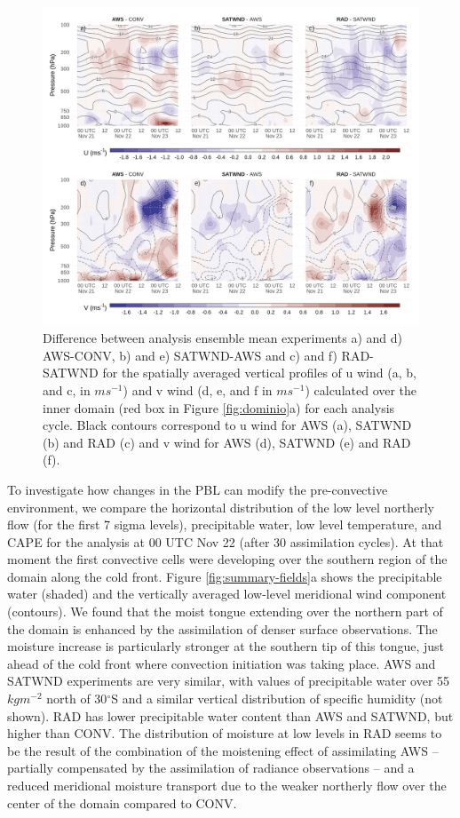 \documentclass[final,5p,times,twocolumn,authoryear]{elsarticle} %
\begin{document}
\begin{figure}[ht]

{\centering \includegraphics{../figures/UV-diff-1} 

}

\caption{Difference between analysis ensemble mean experiments a) and d) AWS-CONV, b) and e) SATWND-AWS and c) and f) RAD-SATWND for the spatially averaged vertical profiles of u wind (a, b, and c, in \(ms^{-1}\)) and v wind (d, e, and f in \(ms^{-1}\)) calculated over the inner domain (red box in Figure \ref{fig:dominio}a) for each analysis cycle. Black contours correspond to u wind for AWS (a), SATWND (b) and RAD (c) and v wind for AWS (d), SATWND (e) and RAD (f).}\label{fig:UV-diff}
\end{figure}

To investigate how changes in the PBL can modify the pre-convective environment, we compare the horizontal distribution of the low level northerly flow (for the first 7 sigma levels), precipitable water, low level temperature, and CAPE for the analysis at 00 UTC Nov 22 (after 30 assimilation cycles). At that moment the first convective cells were developing over the southern region of the domain along the cold front. Figure \ref{fig:summary-fields}a shows the precipitable water (shaded) and the vertically averaged low-level meridional wind component (contours). We found that the moist tongue extending over the northern part of the domain is enhanced by the assimilation of denser surface observations. The moisture increase is particularly stronger at the southern tip of this tongue, just ahead of the cold front where convection initiation was taking place. AWS and SATWND experiments are very similar, with values of precipitable water over 55 \(kgm^{-2}\) north of 30\(^{\circ}\)S and a similar vertical distribution of specific humidity (not shown). RAD has lower precipitable water content than AWS and SATWND, but higher than CONV. The distribution of moisture at low levels in RAD seems to be the result of the combination of the moistening effect of assimilating AWS -- partially compensated by the assimilation of radiance observations -- and a reduced meridional moisture transport due to the weaker northerly flow over the center of the domain compared to CONV.
\end{document}
